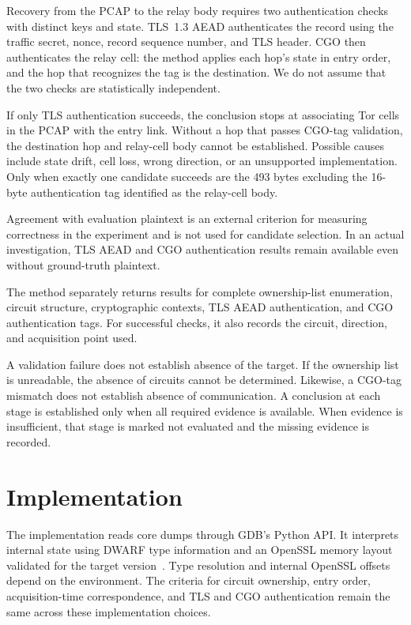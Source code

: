 \documentclass[10pt,a4paper]{article}
\begin{document}
Recovery from the PCAP to the relay body requires two authentication checks with distinct keys and state. TLS~1.3 AEAD authenticates the record using the traffic secret, nonce, record sequence number, and TLS header. CGO then authenticates the relay cell: the method applies each hop's state in entry order, and the hop that recognizes the tag is the destination. We do not assume that the two checks are statistically independent.

If only TLS authentication succeeds, the conclusion stops at associating Tor cells in the PCAP with the entry link. Without a hop that passes CGO-tag validation, the destination hop and relay-cell body cannot be established. Possible causes include state drift, cell loss, wrong direction, or an unsupported implementation. Only when exactly one candidate succeeds are the 493 bytes excluding the 16-byte authentication tag identified as the relay-cell body.

Agreement with evaluation plaintext is an external criterion for measuring correctness in the experiment and is not used for candidate selection. In an actual investigation, TLS AEAD and CGO authentication results remain available even without ground-truth plaintext.

\enlargethispage{2\baselineskip}

The method separately returns results for complete ownership-list enumeration, circuit structure, cryptographic contexts, TLS AEAD authentication, and CGO authentication tags. For successful checks, it also records the circuit, direction, and acquisition point used.

A validation failure does not establish absence of the target. If the ownership list is unreadable, the absence of circuits cannot be determined. Likewise, a CGO-tag mismatch does not establish absence of communication. A conclusion at each stage is established only when all required evidence is available. When evidence is insufficient, that stage is marked not evaluated and the missing evidence is recorded.

\section{Implementation}\label{sec:implementation}

The implementation reads core dumps through GDB's Python API. It interprets internal state using DWARF type information and an OpenSSL memory layout validated for the target version~\cite{gdbcorepython,dwarf5,openssl3022}. Type resolution and internal OpenSSL offsets depend on the environment. The criteria for circuit ownership, entry order, acquisition-time correspondence, and TLS and CGO authentication remain the same across these implementation choices.
\end{document}
